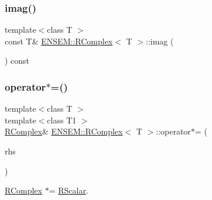 \mbox{\label{classENSEM_1_1RComplex_a8df643a2ba06dc851d19eb35cd4c4cde}} 
\subsubsection{\texorpdfstring{imag()}{imag()}\hspace{0.1cm}{\footnotesize\ttfamily [6/6]}}
{\footnotesize\ttfamily template$<$class T $>$ \\
const T\& \mbox{\hyperlink{classENSEM_1_1RComplex}{E\+N\+S\+E\+M\+::\+R\+Complex}}$<$ T $>$\+::imag (\begin{DoxyParamCaption}{ }\end{DoxyParamCaption}) const\hspace{0.3cm}{\ttfamily [inline]}}

\mbox{\label{classENSEM_1_1RComplex_aaf2adc526cdbb0b29931b21311cd74fe}} 
\subsubsection{\texorpdfstring{operator$\ast$=()}{operator*=()}\hspace{0.1cm}{\footnotesize\ttfamily [1/6]}}
{\footnotesize\ttfamily template$<$class T $>$ \\
template$<$class T1 $>$ \\
\mbox{\hyperlink{classENSEM_1_1RComplex}{R\+Complex}}\& \mbox{\hyperlink{classENSEM_1_1RComplex}{E\+N\+S\+E\+M\+::\+R\+Complex}}$<$ T $>$\+::operator$\ast$= (\begin{DoxyParamCaption}\item[{const \mbox{\hyperlink{classENSEM_1_1RScalar}{R\+Scalar}}$<$ T1 $>$ \&}]{rhs }\end{DoxyParamCaption})\hspace{0.3cm}{\ttfamily [inline]}}



\mbox{\hyperlink{classENSEM_1_1RComplex}{R\+Complex}} $\ast$= \mbox{\hyperlink{classENSEM_1_1RScalar}{R\+Scalar}}. 

